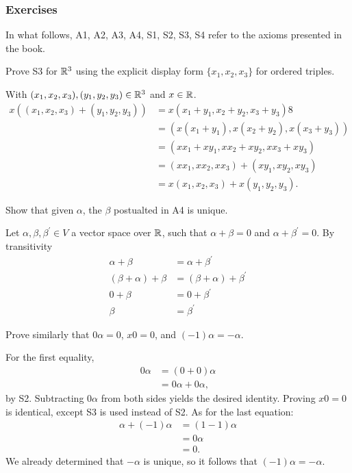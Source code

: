 \documentclass[../../main.tex]{subfiles}
\begin{document}
\subsubsection{Exercises}
In what follows, A1, A2, A3, A4, S1, S2, S3, S4 refer to the axioms presented in the book.
\begin{problem}
	Prove S3 for $\mathbb{R}^3$ using the explicit display form $\{x_1, x_2, x_3\}$ for ordered triples.
\end{problem}
\begin{solution}

With $(x_1, x_2, x_3), (y_1, y_2, y_3) \in \mathbb{R}^3$ and $x \in \mathbb{R}$. 
	\begin{align*} 
		x((x_1, x_2, x_3) + (y_1, y_2, y_3)) &= x(x_1 + y_1, x_2 + y_2, x_3 + y_3) 8 \\ 
	 &=  (x(x_1 + y_1), x(x_2 + y_2), x(x_3 + y_3)) \\
	 &= (xx_1 + xy_1, xx_2 + xy_2, xx_3 + xy_3) \\
	 &= (xx_1, xx_2, xx_3) + (xy_1, xy_2, xy_3) \\
	 &= x(x_1, x_2, x_3) + x(y_1, y_2, y_3).
	\end{align*}
\end{solution}
\begin{problem}
	Show that given $\alpha$, the $\beta$ postualted in A4 is unique.
\end{problem}
\begin{solution}
	Let $\alpha, \beta, \beta^\prime \in V$ a vector space over $\mathbb{R}$, such that $\alpha + \beta = 0$ and $\alpha + \beta^\prime = 0$. By transitivity
	\begin{align*}
		\alpha + \beta &= \alpha + \beta^\prime \\
		(\beta + \alpha) + \beta &= (\beta + \alpha) + \beta^\prime \\
		0 + \beta &= 0 + \beta^\prime \\
		\beta &= \beta^\prime
	\end{align*}
\end{solution}
\begin{problem}
	Prove similarly that $0\alpha = 0$, $x0 = 0$, and $(-1)\alpha = -\alpha$.
\end{problem}
\begin{solution}
For the first equality, 
\begin{align*}
	0\alpha &= (0 + 0)\alpha \\
	& = 0\alpha + 0\alpha,
\end{align*}
 by S2. Subtracting $0\alpha$ from both sides yields the desired identity. Proving $x0 = 0$ is identical, except S3 is used instead of S2. As for the last equation:
 \begin{align*}
 	\alpha + (-1)\alpha &= (1 - 1)\alpha \\
 	&= 0\alpha \\
 	&= 0.
 \end{align*}
 We already determined that $-\alpha$ is unique, so it follows that $(-1)\alpha = -\alpha$.
\end{solution}
\end{document}
